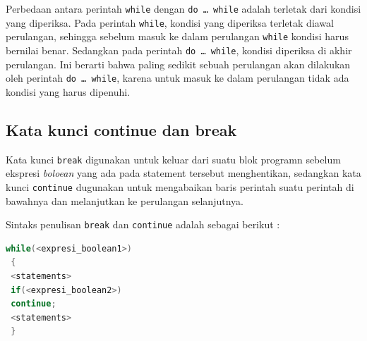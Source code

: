Perbedaan antara perintah \texttt{while} dengan
\texttt{do\ \ldots{}\ while} adalah terletak dari kondisi yang
diperiksa. Pada perintah \texttt{while}, kondisi yang diperiksa terletak
diawal perulangan, sehingga sebelum masuk ke dalam perulangan
\texttt{while} kondisi harus bernilai benar. Sedangkan pada perintah
\texttt{do\ \ldots{}\ while}, kondisi diperiksa di akhir perulangan. Ini
berarti bahwa paling sedikit sebuah perulangan akan dilakukan oleh
perintah \texttt{do\ \ldots{}\ while}, karena untuk masuk ke dalam
perulangan tidak ada kondisi yang harus dipenuhi.

\subsection{Kata kunci continue dan break}\label{kata-kunci-continue-dan-break}

Kata kunci \texttt{break} digunakan untuk keluar dari suatu blok
programn sebelum ekspresi \emph{boloean} yang ada pada statement
tersebut menghentikan, sedangkan kata kunci \texttt{continue} dugunakan
untuk mengabaikan baris perintah suatu perintah di bawahnya dan
melanjutkan ke perulangan selanjutnya.

Sintaks penulisan \texttt{break} dan \texttt{continue} adalah sebagai
berikut :

\begin{lstlisting}[language=c++, numbers=none]
 while(<expresi_boolean1>)
 {
 <statements>
 if(<expresi_boolean2>)
 continue;
 <statements>
 }
\end{lstlisting}